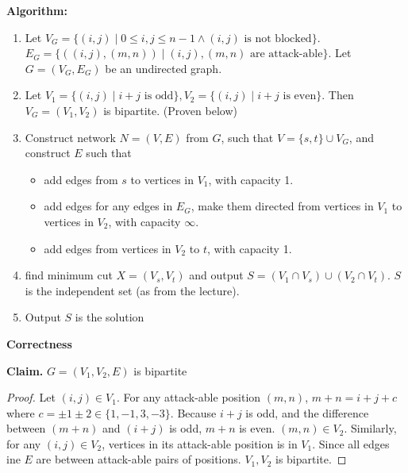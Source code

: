 \documentclass[11pt]{article}
\begin{document}
\begin{enumerate}
    \textbf{Algorithm: }
    \begin{enumerate}
        \item Let $V_G = \{(i,j)\mid 0\leq i,j\leq n-1\land (i,j)\text{ is not blocked}\}$. $E_G=\{((i,j), (m,n))\mid (i,j), (m,n)\text{ are attack-able}\}$. Let $G=(V_G,E_G)$ be an undirected graph. 
        \item Let $V_1=\{(i,j)\mid i+j\text{ is odd}\}, V_2=\{(i,j)\mid i+j\text{ is even}\}$. Then $V_G=(V_1,V_2)$ is bipartite. (Proven below)
        \item Construct network $N=(V, E)$ from $G$, such that $V=\{s,t\}\cup V_G$, and construct $E$ such that
        \begin{itemize}
            \item add edges from $s$ to vertices in $V_1$, with capacity 1.
            \item add edges for any edges in $E_G$, make them directed from vertices in $V_1$ to vertices in $V_2$, with capacity $\infty$.
            \item add edges from vertices in $V_2$ to $t$, with capacity 1.
        \end{itemize}
        \item find minimum cut $X=(V_s, V_t)$ and output $S=(V_1\cap V_s)\cup (V_2\cap V_t)$. $S$ is the independent set (as from the lecture). 
        \item Output $S$ is the solution
    \end{enumerate}
    
    \textbf{Correctness}
    
    \textbf{Claim. }$G=(V_1,V_2,E)$ is bipartite
    \begin{proof}
    Let $(i,j)\in V_1$. For any attack-able position $(m,n)$, $m+n = i+j+c$ where $c=\pm 1 \pm 2\in\{1, -1, 3, -3\}$. Because $i+j$ is odd, and the difference between $(m+n)$ and $(i+j)$ is odd, $m+n$ is even. $(m,n)\in V_2$. Similarly, for any $(i,j)\in V_2$, vertices in its attack-able position is in $V_1$. Since all edges ine $E$ are between attack-able pairs of positions. $V_1, V_2$ is bipartite.
    \end{proof}
    

\end{enumerate}
\end{document}
